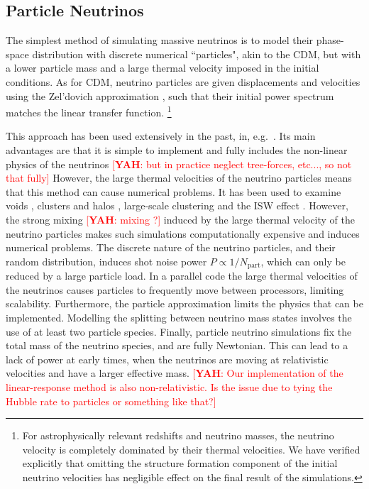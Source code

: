 \documentclass[useAMS, usenatbib]{mnras}
\newcommand{\yah}[1]{{\textcolor{red}{[{\bf YAH}: #1]}}}
\begin{document}
\subsection{Particle Neutrinos}
\label{sec:particle}

The simplest method of simulating massive neutrinos is to model their phase-space distribution with discrete numerical ``particles", akin to the CDM, but with a lower particle mass and a large thermal velocity imposed
in the initial conditions. As for CDM, neutrino particles are given displacements and velocities using the Zel'dovich approximation \citep{Zeldovich_1970}, such that their initial power spectrum matches the linear transfer function. \footnote{For astrophysically relevant redshifts and neutrino masses, the neutrino velocity is completely dominated by their thermal velocities. We have verified explicitly that omitting the structure formation component of the initial neutrino velocities has negligible effect on the final result of the simulations.}

This approach has been used extensively in the past, in, e.g.~\cite{Brandbyge_2008, Bird_2012, Inman_2017, FVN_2017}. Its main advantages are that it is simple to implement and fully includes the non-linear physics of the neutrinos \yah{but in practice neglect tree-forces, etc..., so not that fully} However, the large thermal velocities of the neutrino particles means that this method can cause numerical problems. It has been used to examine voids \citep{Massara_2015}, clusters and halos \citep{FVN_2014, Castorina_2014, Costanzi_2013}, large-scale clustering \citep{Castorina_2015} and the ISW effect \citep{Carbone_2016}. However, the strong mixing \yah{mixing ?} induced by the large thermal velocity of the neutrino particles makes such simulations computationally expensive and induces numerical problems.
The discrete nature of the neutrino particles, and their random distribution, induces shot noise power $P \propto 1/N_\mathrm{part}$, which can only be reduced by a large particle load. In a parallel code the large thermal velocities of the neutrinos causes particles to frequently move between processors, limiting scalability. Furthermore, the particle approximation limits the physics that can be implemented. Modelling the splitting between neutrino mass states involves the use of at least two particle species. Finally, particle neutrino simulations fix the total mass of the neutrino species, and are fully Newtonian. This can lead to a lack of power at early times, when the neutrinos are moving at relativistic velocities and have a larger effective mass. \yah{Our implementation of the linear-response method is also non-relativistic. Is the issue due to tying the Hubble rate to particles or something like that?}
\end{document}
